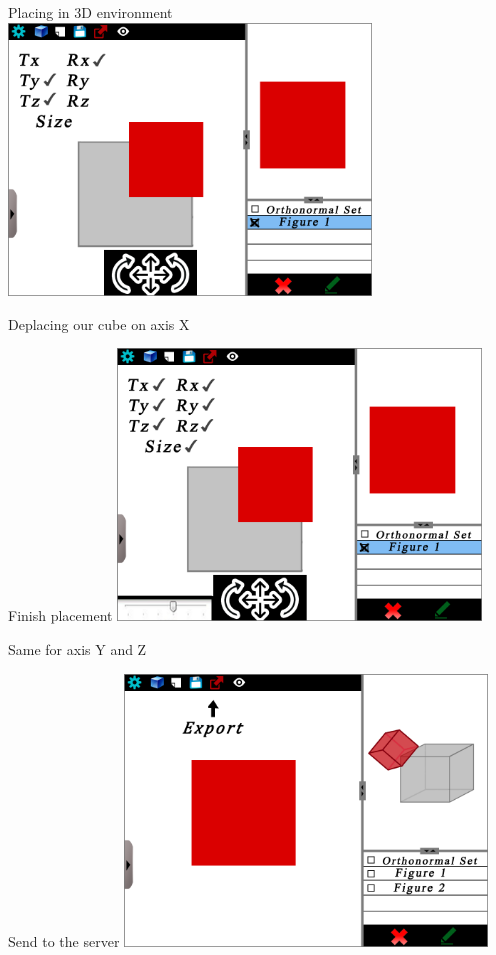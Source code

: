 \documentclass[a4paper,10pt]{beamer}
\begin{document}
			\begin{frame}{Placing in 3D environment}
				\includegraphics[height=205pt]{maquette/maquette_6.png}
				
				Deplacing our cube on axis X
			\end{frame}
			
			\begin{frame}{Finish placement}
				\includegraphics[height=205pt]{maquette/maquette_7.png}
				
				Same for axis Y and Z
			\end{frame}
			
			\begin{frame}{Send to the server}
				\includegraphics[height=205pt]{maquette/maquette_8.png}
			\end{frame}
			
\end{document}
